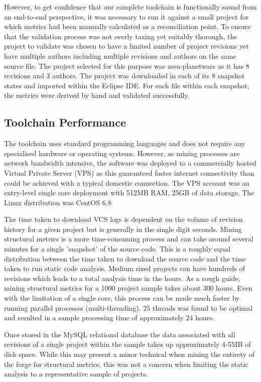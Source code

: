 However, to get confidence that our complete toolchain is functionally sound from an end-to-end perspective, it was necessary to run it against a small project for which metrics had been manually calculated as a reconciliation point. To ensure that the validation process was not overly taxing yet suitably thorough, the project to validate was chosen to have a limited number of project revisions yet have multiple authors including multiple revisions and authors on the same source file. The project selected for this purpose was zsea-planetwars as it has 8 revisions and 3 authors. The project was downloaded in each of its 8 snapshot states and imported within the Eclipse IDE. For each file within each snapshot, the metrics were derived by hand and validated successfully.

\subsection{Toolchain Performance}
The toolchain uses standard programming languages and does not require any specialised hardware or operating systems. However, as mining processes are network bandwidth intensive, the software was deployed to a commercially hosted Virtual Private Server (VPS) as this guaranteed faster internet connectivity than could be achieved with a typical domestic connection. The VPS account was an entry-level single core deployment with 512MB RAM, 25GB of data storage. The Linux distribution was CentOS 6.8.

The time taken to download VCS logs is dependent on the volume of revision history for a given project but is generally in the single digit seconds. Mining structural metrics is a more time-consuming process and can take around several minutes for a single 'snapshot' of the source code. This is a roughly equal distribution between the time taken to download the source code and the time taken to run static code analysis. Medium sized projects can have hundreds of revisions which leads to a total analysis time in the hours. As a rough guide, mining structural metrics for a 1000 project sample takes about 300 hours. Even with the limitation of a single core, this process can be made much faster by running parallel processes (multi-threading). 25 threads was found to be optimal and resulted in a sample processing time of approximately 24 hours.

Once stored in the MySQL relational database the data associated with all revisions of a single project within the sample takes up approximately 4-5MB of disk space. While this may present a minor technical when mining the entirety of the forge for structural metrics, this was not a concern when limiting the static analysis to a representative sample of projects.

